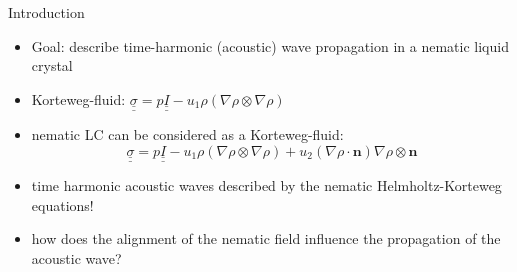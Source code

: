 \documentclass[11pt,aspectratio=169,xcolor=dvipsnames]{beamer}
\newcommand{\nicearrow}[2]{\raisebox{#2}{\resizebox{0.45cm}{!}{\color{#1}{\MVRightArrow}\color{black}}}}
\begin{document}
\begin{frame}{Introduction}
  \begin{minipage}{0.7\textwidth}
    \begin{itemize}
      \item \alert{Goal:} describe time-harmonic (acoustic) wave propagation in a \alert{nematic liquid crystal} 
      \item<2-> Korteweg-fluid: $\underline{\underline{\sigma}} = p \underline{\underline{I}} - u_1 \rho (\nabla \rho \otimes \nabla \rho)$
      \item<3-> nematic LC can be considered as a Korteweg-fluid:
      \begin{equation*}
        \underline{\underline{\sigma}} = p \underline{\underline{I}} - u_1 \rho (\nabla \rho \otimes \nabla \rho) + u_2 (\nabla \rho \cdot \bm{n}) \nabla \rho \otimes \bm{n}
      \end{equation*}
      \item<4->[\nicearrow{GOE}{-0.07cm}] time harmonic acoustic waves described by the \alert{nematic Helmholtz-Korteweg} equations! 
      \item<4->[\nicearrow{GOE}{-0.07cm}] how does the alignment of the nematic field influence the propagation of the acoustic wave? 
    \end{itemize}
  \end{minipage}
  \hfill
  \begin{minipage}{0.29\textwidth}
    \begin{center}
    \end{center}
  \end{minipage}
\end{frame}
\end{document}
